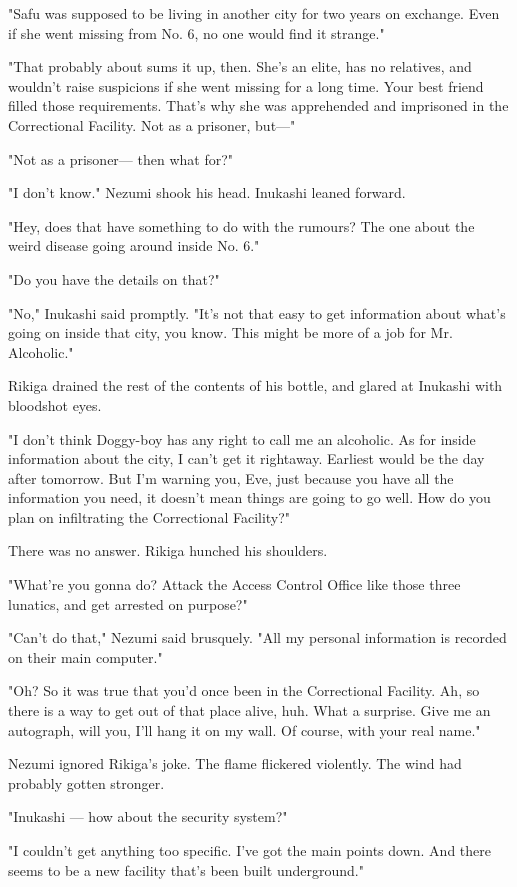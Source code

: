"Safu was supposed to be living in another city for two years on
exchange. Even if she went missing from No. 6, no one would find it
strange."

"That probably about sums it up, then. She's an elite, has no relatives,
and wouldn't raise suspicions if she went missing for a long time. Your
best friend filled those requirements. That's why she was apprehended
and imprisoned in the Correctional Facility. Not as a prisoner, but---"

"Not as a prisoner--- then what for?"

"I don't know." Nezumi shook his head. Inukashi leaned forward.

"Hey, does that have something to do with the rumours? The one about the
weird disease going around inside No. 6."

"Do you have the details on that?"

"No," Inukashi said promptly. "It's not that easy to get information
about what's going on inside that city, you know. This might be more of
a job for Mr. Alcoholic."

Rikiga drained the rest of the contents of his bottle, and glared at
Inukashi with bloodshot eyes.

"I don't think Doggy-boy has any right to call me an alcoholic. As for
inside information about the city, I can't get it rightaway. Earliest
would be the day after tomorrow. But I'm warning you, Eve, just because
you have all the information you need, it doesn't mean things are going
to go well. How do you plan on infiltrating the Correctional Facility?"

There was no answer. Rikiga hunched his shoulders.

"What're you gonna do? Attack the Access Control Office like those three
lunatics, and get arrested on purpose?"

"Can't do that," Nezumi said brusquely. "All my personal information is
recorded on their main computer."

"Oh? So it was true that you'd once been in the Correctional Facility.
Ah, so there is a way to get out of that place alive, huh. What a
surprise. Give me an autograph, will you, I'll hang it on my wall. Of
course, with your real name."

Nezumi ignored Rikiga's joke. The flame flickered violently. The wind
had probably gotten stronger.

"Inukashi --- how about the security system?"

"I couldn't get anything too specific. I've got the main points down.
And there seems to be a new facility that's been built underground."

